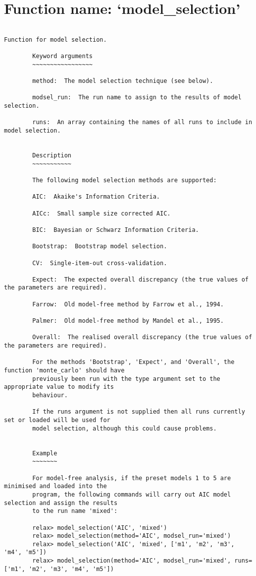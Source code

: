 \normalsize
\section{Function name: `model\_selection'}

\scriptsize
\begin{verbatim}

Function for model selection.

        Keyword arguments
        ~~~~~~~~~~~~~~~~~

        method:  The model selection technique (see below).

        modsel_run:  The run name to assign to the results of model selection.

        runs:  An array containing the names of all runs to include in model selection.


        Description
        ~~~~~~~~~~~

        The following model selection methods are supported:

        AIC:  Akaike's Information Criteria.

        AICc:  Small sample size corrected AIC.

        BIC:  Bayesian or Schwarz Information Criteria.

        Bootstrap:  Bootstrap model selection.

        CV:  Single-item-out cross-validation.

        Expect:  The expected overall discrepancy (the true values of the parameters are required).

        Farrow:  Old model-free method by Farrow et al., 1994.

        Palmer:  Old model-free method by Mandel et al., 1995.

        Overall:  The realised overall discrepancy (the true values of the parameters are required).

        For the methods 'Bootstrap', 'Expect', and 'Overall', the function 'monte_carlo' should have
        previously been run with the type argument set to the appropriate value to modify its
        behaviour.

        If the runs argument is not supplied then all runs currently set or loaded will be used for
        model selection, although this could cause problems.


        Example
        ~~~~~~~

        For model-free analysis, if the preset models 1 to 5 are minimised and loaded into the
        program, the following commands will carry out AIC model selection and assign the results
        to the run name 'mixed':

        relax> model_selection('AIC', 'mixed')
        relax> model_selection(method='AIC', modsel_run='mixed')
        relax> model_selection('AIC', 'mixed', ['m1', 'm2', 'm3', 'm4', 'm5'])
        relax> model_selection(method='AIC', modsel_run='mixed', runs=['m1', 'm2', 'm3', 'm4', 'm5'])
        
\end{verbatim}

\normalsize
